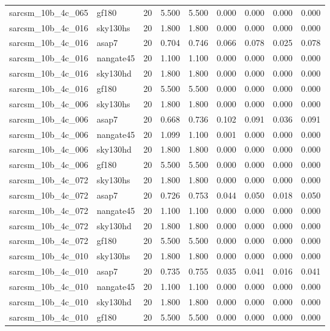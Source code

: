 \begin{tabular}{llrrrrrrr}
sarcsm\_10b\_4c\_065 & gf180 & 20 & 5.500 & 5.500 & 0.000 & 0.000 & 0.000 & 0.000 \\
sarcsm\_10b\_4c\_016 & sky130hs & 20 & 1.800 & 1.800 & 0.000 & 0.000 & 0.000 & 0.000 \\
sarcsm\_10b\_4c\_016 & asap7 & 20 & 0.704 & 0.746 & 0.066 & 0.078 & 0.025 & 0.078 \\
sarcsm\_10b\_4c\_016 & nangate45 & 20 & 1.100 & 1.100 & 0.000 & 0.000 & 0.000 & 0.000 \\
sarcsm\_10b\_4c\_016 & sky130hd & 20 & 1.800 & 1.800 & 0.000 & 0.000 & 0.000 & 0.000 \\
sarcsm\_10b\_4c\_016 & gf180 & 20 & 5.500 & 5.500 & 0.000 & 0.000 & 0.000 & 0.000 \\
sarcsm\_10b\_4c\_006 & sky130hs & 20 & 1.800 & 1.800 & 0.000 & 0.000 & 0.000 & 0.000 \\
sarcsm\_10b\_4c\_006 & asap7 & 20 & 0.668 & 0.736 & 0.102 & 0.091 & 0.036 & 0.091 \\
sarcsm\_10b\_4c\_006 & nangate45 & 20 & 1.099 & 1.100 & 0.001 & 0.000 & 0.000 & 0.000 \\
sarcsm\_10b\_4c\_006 & sky130hd & 20 & 1.800 & 1.800 & 0.000 & 0.000 & 0.000 & 0.000 \\
sarcsm\_10b\_4c\_006 & gf180 & 20 & 5.500 & 5.500 & 0.000 & 0.000 & 0.000 & 0.000 \\
sarcsm\_10b\_4c\_072 & sky130hs & 20 & 1.800 & 1.800 & 0.000 & 0.000 & 0.000 & 0.000 \\
sarcsm\_10b\_4c\_072 & asap7 & 20 & 0.726 & 0.753 & 0.044 & 0.050 & 0.018 & 0.050 \\
sarcsm\_10b\_4c\_072 & nangate45 & 20 & 1.100 & 1.100 & 0.000 & 0.000 & 0.000 & 0.000 \\
sarcsm\_10b\_4c\_072 & sky130hd & 20 & 1.800 & 1.800 & 0.000 & 0.000 & 0.000 & 0.000 \\
sarcsm\_10b\_4c\_072 & gf180 & 20 & 5.500 & 5.500 & 0.000 & 0.000 & 0.000 & 0.000 \\
sarcsm\_10b\_4c\_010 & sky130hs & 20 & 1.800 & 1.800 & 0.000 & 0.000 & 0.000 & 0.000 \\
sarcsm\_10b\_4c\_010 & asap7 & 20 & 0.735 & 0.755 & 0.035 & 0.041 & 0.016 & 0.041 \\
sarcsm\_10b\_4c\_010 & nangate45 & 20 & 1.100 & 1.100 & 0.000 & 0.000 & 0.000 & 0.000 \\
sarcsm\_10b\_4c\_010 & sky130hd & 20 & 1.800 & 1.800 & 0.000 & 0.000 & 0.000 & 0.000 \\
sarcsm\_10b\_4c\_010 & gf180 & 20 & 5.500 & 5.500 & 0.000 & 0.000 & 0.000 & 0.000 \\

\end{tabular}
